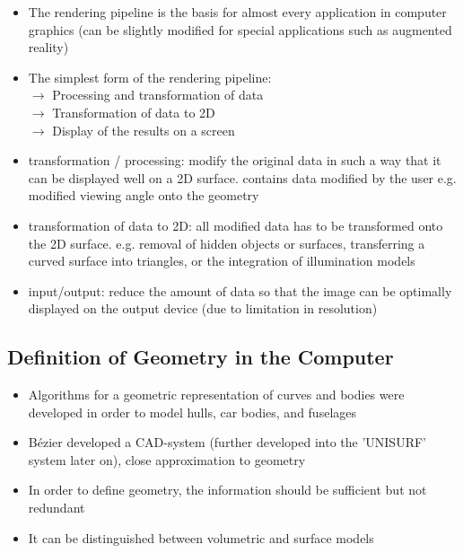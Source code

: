 \documentclass{standalone}
\begin{document}
\begin{itemize}
	\item The rendering pipeline is the basis for almost every application in computer graphics
	(can be slightly modified for special applications such as augmented reality)
	\item The simplest form of the rendering pipeline: \\
	$\rightarrow$ Processing and transformation of data \\
	$\rightarrow$ Transformation of data to 2D \\
	$\rightarrow$ Display of the results on a screen
	\item transformation / processing: modify the original data in such a way that it can be displayed well on a 2D surface. contains data modified by the user e.g. modified viewing angle onto the geometry
	\item transformation of data to 2D: all modified data has to be transformed onto the 2D surface. e.g. removal of hidden objects or surfaces, transferring a curved surface into triangles, or the integration of illumination models
	\item input/output: reduce the amount of data so that the image can be optimally displayed on the output device (due to limitation in resolution)
\end{itemize}

\subsection{Definition of Geometry in the Computer}

\begin{itemize}
	\item Algorithms for a geometric representation of curves and bodies were developed in order to model hulls, car bodies, and fuselages
	\item B\'ezier developed a CAD-system (further developed into the 'UNISURF' system later on), close approximation to geometry
	\item In order to define geometry, the information should be sufficient but not redundant
	\item It can be distinguished between volumetric and surface models
\end{itemize}
\end{document}
